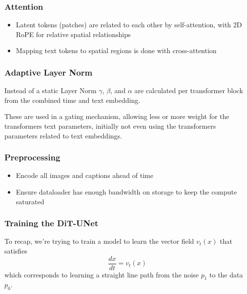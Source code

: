 \documentclass{beamer}
\begin{document}
\begin{frame}
    \frametitle{Attention}
    \begin{itemize}
        \setlength{\itemsep}{1em}
        \item Latent tokens (patches) are related to each other by self-attention, with 2D RoPE for relative spatial relationships
        \item Mapping text tokens to spatial regions is done with cross-attention
    \end{itemize}
\end{frame}

\begin{frame}
    \frametitle{Adaptive Layer Norm}
    Instead of a static Layer Norm $\gamma$, $\beta$, and $\alpha$ are calculated per transformer block from the combined time and text embedding.

    \vspace{5mm}
    These are used in a gating mechanism, allowing less or more weight for the transformers text parameters, initially not even using the transformers parameters related to text embeddings.
\end{frame}

\begin{frame}
    \frametitle{Preprocessing}
    \begin{itemize}
        \setlength{\itemsep}{1em}
        \item Encode all images and captions ahead of time
        \item Ensure dataloader has enough bandwidth on storage to keep the compute saturated
    \end{itemize}
\end{frame}

\begin{frame}[fragile]
    \frametitle{Training the DiT-UNet}
    To recap, we're trying to train a model to learn the vector field $v_t(x)$ that satisfies $$\frac{dx}{dt}=v_t(x)$$ which corresponds to learning a straight line path from the noise $p_1$ to the data $p_0$.

    \begin{center}
    \end{center}
\end{frame}
\end{document}
